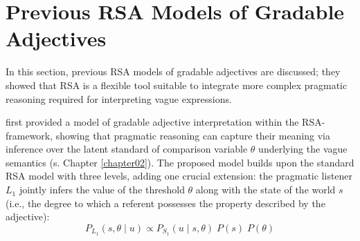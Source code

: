 
\section{Previous RSA Models of Gradable Adjectives}
In this section, previous RSA models of gradable adjectives are discussed; they showed that RSA is a flexible tool suitable to integrate more complex pragmatic reasoning required for interpreting vague expressions.

\textcite{lassiter2013context} first provided a model of gradable adjective interpretation within the RSA-framework, showing that pragmatic reasoning can capture their meaning via inference over the latent standard of comparison variable $\theta$ underlying the vague semantics (s. Chapter \ref{chapter02}). %
The proposed model builds upon the standard RSA model with three levels, adding one crucial extension: the pragmatic listener $L_1$ jointly infers the value of the threshold $\theta$ along with the state of the world $s$ (i.e., the degree to which a referent possesses the property described by the adjective):
\begin{equation}
P_{L_1} (s, \theta \mid u) \propto P_{S_1} (u \mid s, \theta) \; P (s) \; P(\theta)
\end{equation} 

